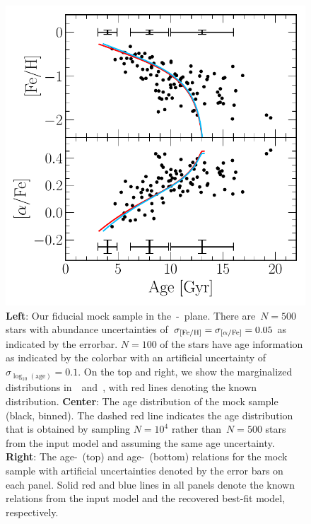 \documentclass[ms.tex]{subfiles}
\begin{document}
\begin{figure}
\includegraphics[scale = 0.42]{fiducial_mock_amr.pdf}
\caption{
\textbf{Left}: Our fiducial mock sample in the~\afe-\feh~plane.
There are~$N = 500$ stars with abundance uncertainties of~$\sigma_{\text{[Fe/H]}} =
\sigma_{\text{[$\alpha$/Fe]}} = 0.05$ as indicated by the errorbar.
$N = 100$ of the stars have age information as indicated by the colorbar with
an artificial uncertainty of~$\sigma_{\log_{10}(\text{age})} = 0.1$.
On the top and right, we show the marginalized distributions in~\afe~and~\feh,
with red lines denoting the known distribution.
\textbf{Center}: The age distribution of the mock sample (black, binned).
The dashed red line indicates the age distribution that is obtained by sampling
$N = 10^4$ rather than~$N = 500$ stars from the input model and assuming the
same age uncertainty.
\textbf{Right}: The age-\feh~(top) and age-\afe~(bottom) relations for the
mock sample with artificial uncertainties denoted by the error bars on each
panel.
Solid red and blue lines in all panels denote the known relations from the
input model and the recovered best-fit model, respectively.
}
\label{fig:fiducial_mock}
\end{figure}
\end{document}
